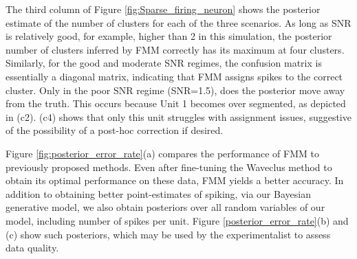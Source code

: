 \documentclass[journal]{IEEEtran}
\begin{document}
The third column of Figure \ref{fig:Sparse_firing_neuron} shows the posterior estimate of the number of clusters for each of the three scenarios.  As long as SNR is relatively good, for example, higher than 2 in this simulation, the posterior number of clusters inferred by FMM correctly has its maximum at four clusters.  Similarly, for the good and moderate SNR regimes, the confusion matrix is essentially a diagonal matrix, indicating that FMM assigns spikes to the correct cluster.  Only in the poor SNR regime (SNR=1.5), does the posterior move away from the truth.  This occurs because Unit 1 becomes over segmented, as depicted in (c2).  (c4) shows that only this unit struggles with assignment issues, suggestive of the possibility of a post-hoc correction if desired.

Figure \ref{fig:posterior_error_rate}(a) compares the performance of FMM to previously proposed methods.  Even after fine-tuning the Waveclus method to obtain its optimal performance on these data, FMM yields a better accuracy.  
In addition to obtaining better point-estimates of spiking, via our Bayesian generative model, we also obtain posteriors over all random variables of our model, including number of spikes per unit.  Figure \ref{posterior_error_rate}(b) and (c) show such posteriors, which may be used by the experimentalist to assess data quality.

\end{document}
